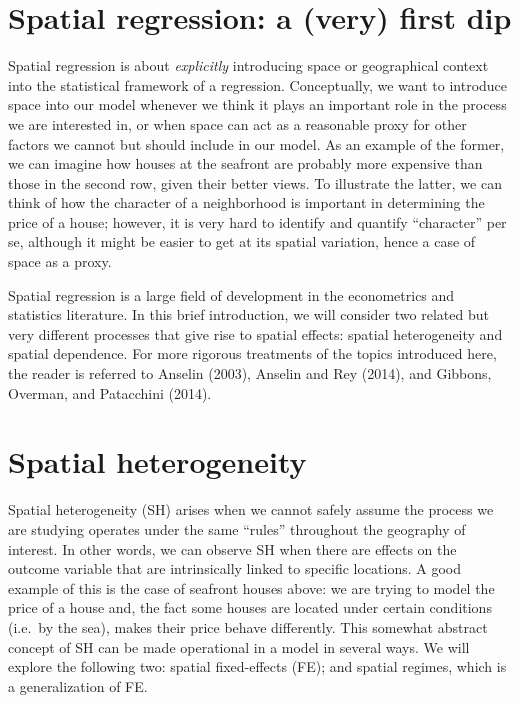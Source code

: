 \documentclass[
  letterpaper,
  DIV=11,
  numbers=noendperiod,
  oneside]{scrreprt}
\begin{document}
\section{Spatial regression: a (very) first
dip}\label{spatial-regression-a-very-first-dip}

Spatial regression is about \emph{explicitly} introducing space or
geographical context into the statistical framework of a regression.
Conceptually, we want to introduce space into our model whenever we
think it plays an important role in the process we are interested in, or
when space can act as a reasonable proxy for other factors we cannot but
should include in our model. As an example of the former, we can imagine
how houses at the seafront are probably more expensive than those in the
second row, given their better views. To illustrate the latter, we can
think of how the character of a neighborhood is important in determining
the price of a house; however, it is very hard to identify and quantify
``character'' per se, although it might be easier to get at its spatial
variation, hence a case of space as a proxy.

Spatial regression is a large field of development in the econometrics
and statistics literature. In this brief introduction, we will consider
two related but very different processes that give rise to spatial
effects: spatial heterogeneity and spatial dependence. For more rigorous
treatments of the topics introduced here, the reader is referred to
Anselin (2003), Anselin and Rey (2014), and Gibbons, Overman, and
Patacchini (2014).

\section{Spatial heterogeneity}\label{spatial-heterogeneity-1}

Spatial heterogeneity (SH) arises when we cannot safely assume the
process we are studying operates under the same ``rules'' throughout the
geography of interest. In other words, we can observe SH when there are
effects on the outcome variable that are intrinsically linked to
specific locations. A good example of this is the case of seafront
houses above: we are trying to model the price of a house and, the fact
some houses are located under certain conditions (i.e.~by the sea),
makes their price behave differently. This somewhat abstract concept of
SH can be made operational in a model in several ways. We will explore
the following two: spatial fixed-effects (FE); and spatial regimes,
which is a generalization of FE.
\end{document}
